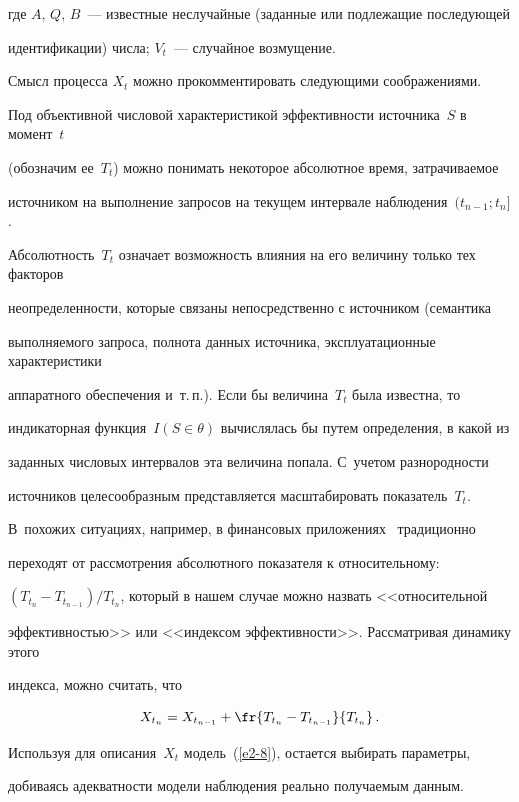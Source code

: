где $A$, $Q$, $B$~--- известные неслучайные (заданные или подлежащие последующей 


идентификации) числа;  $V_t$~--- случайное возмущение.


      


      Смысл процесса $X_t$ можно прокомментировать следующими соображениями. 


Под объективной числовой характеристикой эффективности источника~$S$ в момент~$t$ 


(обозначим ее~$T_t$) можно понимать некоторое абсолютное время, затрачиваемое 


источником на выполнение запросов на текущем интервале наблюдения~$(t_{n-1};t_n]$. 


Абсолютность~$T_t$ означает возможность влияния на его величину только тех факторов 


неопределенности, которые связаны непосредственно с источником (семантика 


выполняемого запроса, полнота данных источника, эксплуатационные характеристики 


аппаратного обеспечения и~т.\,п.). Если бы величина~$T_t$ была известна, то 


индикаторная функция~$I(S\in \theta)$ вычислялась бы путем определения, в какой из 


заданных числовых интервалов эта величина попала. С~учетом разнородности 


источников целесообразным представляется масштабировать показатель~$T_t$. 


В~похожих ситуациях, например, в финансовых приложениях~\cite{8-8} традиционно 


переходят от рассмотрения абсолютного показателя к относительному: 


$(T_{t_n}-T_{t_{n-1}})/T_{t_n}$, который в нашем случае можно назвать <<относительной 


эффективностью>> или <<индексом эффективности>>. Рассматривая динамику этого 


индекса, можно считать, что 


$$


X_{t_n}=X_{t_{n-1}}+\fr{T_{t_n}-T_{t_{n-1}}}{T_{t_n}}\,.


$$ 


Используя для описания~$X_t$ модель~(\ref{e2-8}), остается выбирать параметры, 


добиваясь адекватности модели наблюдения реально получаемым данным.


